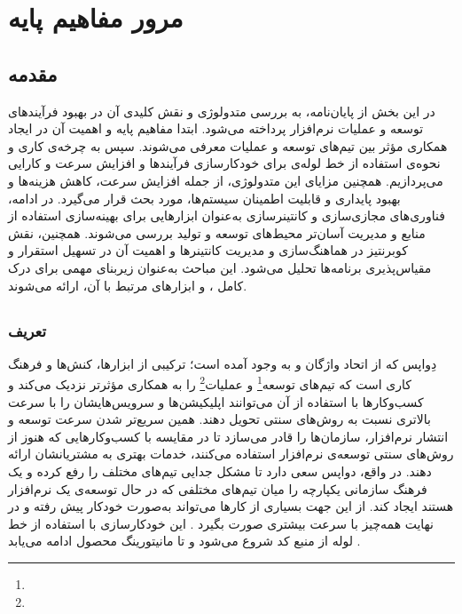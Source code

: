 \chapter{مرور مفاهیم پایه}

\section{مقدمه}

در این بخش از پایان‌نامه، به بررسی متدولوژی  و نقش کلیدی آن در بهبود فرآیندهای توسعه و عملیات نرم‌افزار پرداخته می‌شود. ابتدا مفاهیم پایه  و اهمیت آن در ایجاد همکاری مؤثر بین تیم‌های توسعه و عملیات معرفی می‌شوند. سپس به چرخه‌ی کاری  و نحوه‌ی استفاده از خط لوله‌ی  برای خودکارسازی فرآیندها و افزایش سرعت و کارایی می‌پردازیم. همچنین مزایای این متدولوژی، از جمله افزایش سرعت، کاهش هزینه‌ها و بهبود پایداری و قابلیت اطمینان سیستم‌ها، مورد بحث قرار می‌گیرد. در ادامه، فناوری‌های مجازی‌سازی و کانتینرسازی به‌عنوان ابزارهایی برای بهینه‌سازی استفاده از منابع و مدیریت آسان‌تر محیط‌های توسعه و تولید بررسی می‌شوند. همچنین، نقش کوبرنتیز در هماهنگ‌سازی و مدیریت کانتینرها و اهمیت آن در تسهیل استقرار و مقیاس‌پذیری برنامه‌ها تحلیل می‌شود. این مباحث به‌عنوان زیربنای مهمی برای درک کامل ،  و ابزارهای مرتبط با آن، ارائه می‌شوند.


\section{}

\subsection{تعریف}
دِواپس که از اتحاد واژگان 
و
به وجود آمده است؛ ترکیبی از ابزارها، کنش‌ها و فرهنگ کاری است که تیم‌های توسعه\footnote{} و عملیات\footnote{} را به همکاری مؤثرتر نزدیک می‌کند و کسب‌وکارها با استفاده از آن می‌توانند اپلیکیشن‌ها و سرویس‌هایشان را با سرعت بالاتری نسبت به روش‌های سنتی تحویل دهند. همین سریع‌تر شدن سرعت توسعه و انتشار نرم‌افزار، سازمان‌ها را قادر می‌سازد تا در مقایسه با کسب‌وکارهایی که هنوز از روش‌های سنتی توسعه‌ی نرم‌افزار استفاده می‌کنند، خدمات بهتری به مشتریانشان ارائه دهند. در واقع، دواپس سعی دارد تا مشکل جدایی تیم‌های مختلف را رفع کرده و یک فرهنگ سازمانی یکپارچه را میان تیم‌های مختلفی که در حال توسعه‌ی یک نرم‌افزار هستند ایجاد کند. از این جهت بسیاری از کارها می‌تواند به‌صورت خودکار پیش رفته و در نهایت همه‌چیز با سرعت بیشتری صورت بگیرد \cite{DevopsDef1,DevopsDef2}. این خودکارسازی با استفاده از خط لوله
از منبع کد شروع می‌شود و تا مانیتورینگ محصول ادامه می‌یابد \cite{DevopsCICD1}.


